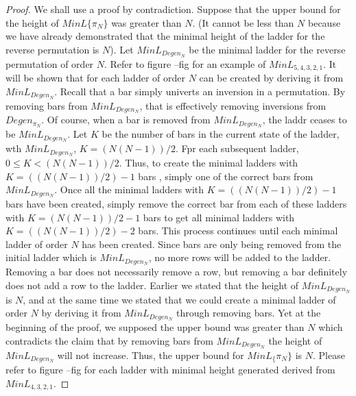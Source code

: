    \begin{proof}
       We shall use a proof by contradiction. Suppose that the upper bound for the height of $MinL\{\pi_{N}\}$ was greater than $N$. (It cannot be less than $N$ because 
       we have already demonstrated that the minimal height of the ladder for the reverse permutation is $N$). Let $MinL_{Degen_{N}}$ be the 
       minimal ladder for the reverse permutation of order $N$. Refer to figure --fig for an example of $MinL_{5,4,3,2,1}$. It will be shown that for each 
       ladder of order $N$ can be created by deriving it from $MinL_{Degen_{N}}$.
       Recall that a bar simply univerts an inversion in a permutation. By removing bars from $MinL_{Degen_{N}}$, that is effectively removing 
       inversions from $Degen_{\pi_{N}}$. Of course, when a bar is removed from  $MinL_{Degen_{N}}$, the laddr ceases to be  $MinL_{Degen_{N}}$. 
       Let $K$ be the number of bars in the current state of the ladder, wth $MinL_{Degen_{N}}$, $K=(N(N-1))/2$. Fpr each subsequent 
       ladder, $0 \leq K < (N(N-1))/2$. Thus, to create the minimal ladders with  $K=((N(N-1))/2)-1$ bars , simply one of the correct bars from $MinL_{Degen_{N}}$. 
       Once all the minimal ladders with  $K=((N(N-1))/2)-1$ bars have been created, simply remove the correct bar from each of these ladders with 
        $K=(N(N-1))/2-1$ bars to get all minimal ladders with  $K=((N(N-1))/2)-2$ bars.
       This process continues until each minimal ladder of order $N$ has been created. Since bars are only being removed from the initial ladder which is $MinL_{Degen_{N}}$, no more rows 
       will be added to the ladder. Removing a bar does not necessarily remove a row, but removing a bar definitely does not add a row to the ladder. Earlier we stated that 
       the height of $MinL_{Degen_{N}}$ is $N$, and at the same time we stated that we could create a minimal ladder of order $N$ by deriving it from $MinL_{Degen_{N}}$ 
       through removing bars. Yet at the beginning of the proof, 
       we supposed the upper bound was greater than $N$ which contradicts the claim that by removing bars from  
       $MinL_{Degen_{N}}$ the height of  $MinL_{Degen_{N}}$ will not increase. Thus, the upper bound for $MinL_\{\pi_{N}\}$ is $N$. 
       Please refer to figure --fig for each ladder with minimal height generated derived from $MinL_{4,3,2,1}$. 

   \end{proof}\pagebreak

